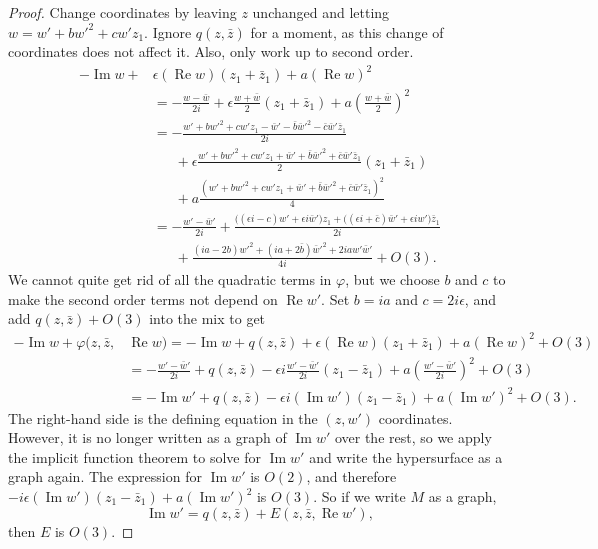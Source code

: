 \documentclass[12pt,openany]{book}
\renewcommand{\Re}{\operatorname{Re}}
\renewcommand{\Im}{\operatorname{Im}}
\theoremstyle{plain}
\theoremstyle{remark}
\theoremstyle{definition}
\theoremstyle{exercise}
\theoremstyle{example}
\begin{document}
\begin{proof}
Change coordinates
by leaving $z$ unchanged and letting $w = w'+bw'^2+cw'z_1$.  Ignore
$q(z,\bar{z})$ for a moment, as
this change of coordinates does not affect it.  Also, only work up to
second order.
\begin{equation*}
\begin{split}
-\Im w +
& \epsilon (\Re w) (z_1+\bar{z}_1)
+
a {(\Re w)}^2
\\
& =
-\frac{w-\bar{w}}{2i} +
\epsilon \frac{w+\bar{w}}{2}(z_1+\bar{z}_1)
+
a{\left(\frac{w+\bar{w}}{2}\right)}^2
\\
& =
-\frac{w'+bw'^2+cw'z_1-\bar{w}'-\bar{b}\bar{w}'^2-\bar{c}\bar{w}'\bar{z}_1}{2i} 
\\
& \phantom{=}~
+\epsilon \frac{w'+bw'^2+cw'z_1+\bar{w}'+\bar{b}\bar{w}'^2+\bar{c}\bar{w}'\bar{z}_1}{2}(z_1+\bar{z}_1)
\\
& \phantom{=}~
+ a \frac{{(w'+bw'^2+cw'z_1+\bar{w}'+\bar{b}\bar{w}'^2+\bar{c}\bar{w}'\bar{z}_1)}^2}{4}
\\
& =
-\frac{w'-\bar{w}'}{2i} 
+\frac{
\bigl((\epsilon i-c)w'
+\epsilon i\bar{w}'\bigr)z_1
+\bigl((\epsilon i+\bar{c})\bar{w}'
+\epsilon iw'\bigr)\bar{z}_1
}{2i}
\\
& \phantom{=}~
+ \frac{(ia-2b)w'^2+(ia+2\bar{b})\bar{w}'^2+2iaw'\bar{w}'}{4i}
+O(3) .
\end{split}
\end{equation*}
We cannot quite get rid of all the quadratic terms in $\varphi$, but we 
choose $b$ and $c$ to make the second order terms not depend on $\Re w'$.
Set $b=ia$ and $c=2i\epsilon$, and add $q(z,\bar{z}) + O(3)$ into the mix
to get
\begin{equation*}
\begin{split}
-\Im w + \varphi(z,\bar{z}, & \Re w)  =
-\Im w +
q(z,\bar{z}) +
\epsilon (\Re w) (z_1+\bar{z}_1)
+ a{(\Re w)}^2
+O(3)
\\
& =
-\frac{w'-\bar{w}'}{2i} 
+
q(z,\bar{z}) 
- \epsilon i
\frac{w' -\bar{w}'}{2i}
( z_1 -\bar{z}_1)
+ a {\left(\frac{w'-\bar{w}'}{2i}\right)}^2
+O(3)
\\
& =
-\Im w'
+ q(z,\bar{z})
-
\epsilon i
(\Im w')
( z_1 -\bar{z}_1)
+
a {(\Im w')}^2
+O(3) .
\end{split}
\end{equation*}
The right-hand side is the defining equation in the $(z,w')$ coordinates.
However, it is no longer written as a graph of $\Im w'$ over the
rest, so we apply the implicit
function theorem to solve for $\Im w'$
and write the hypersurface as a graph again.
The expression for $\Im w'$
is $O(2)$, and therefore $-i\epsilon (\Im w')(z_1-\bar{z}_1)+a{(\Im w')}^2$
is $O(3)$.
So if we write $M$ as a graph,
\begin{equation*}
\Im w' = q(z,\bar{z}) + E(z,\bar{z},\Re w'),
\end{equation*}
then $E$ is $O(3)$.


\end{proof}
\end{document}
